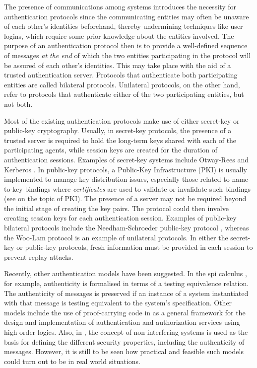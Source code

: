 \documentclass[10pt,a4paper,final,oneside,fleqn]{book}
\begin{document}
The presence of communications among systems introduces the necessity for authentication protocols since the communicating entities may often be unaware of each other's identities beforehand, thereby undermining techniques like user logins, which require some prior knowledge about the entities involved.  The purpose of an authentication protocol then is to provide a well-defined sequence of messages {\itshape at the end\/} of which the two entities participating in the protocol will be assured of each other's identities.  This may take place with the aid of a trusted authentication server.  Protocols that authenticate both participating entities are called bilateral protocols.  Unilateral protocols, on the other hand, refer to protocols that authenticate either of the two participating entities, but not both.

Most of the existing authentication protocols make use of either secret-key or public-key cryptography.  Usually, in secret-key protocols, the presence of a trusted server is required to hold the long-term keys shared with each of the participating agents, while session keys are created for the duration of authentication sessions.  Examples of secret-key systems include Otway-Rees \cite{otway1} and Kerberos \cite{miller1}.  In public-key protocols, a Public-Key Infrastructure (PKI) is usually implemented to manage key distribution issues, especially those related to name-to-key bindings where {\itshape certificates\/} are used to validate or invalidate such bindings (see \cite{ford1} on the topic of PKI).  The presence of a server may not be required beyond the initial stage of creating the key pairs.  The protocol could then involve creating session keys for each authentication session.  Examples of public-key bilateral protocols include the Needham-Schroeder public-key protocol \cite{needham1}, whereas the Woo-Lam protocol \cite{woo1} is an example of unilateral protocols.  In either the secret-key or public-key protocols, fresh information must be provided in each session to prevent replay attacks.

Recently, other authentication models have been suggested.  In the spi calculus \cite{abadi1}, for example, authenticity is formalised in terms of a testing equivalence relation.  The authenticity of messages is preserved if an instance of a system instantiated with that message is testing equivalent to the system's specification.  Other models include the use of proof-carrying code in \cite{appel1,bauer1} as a general framework for the design and implementation of authentication and authorization services using high-order logics.  Also, in \cite{focardi5}, the concept of non-interfering systems is used as the basis for defining the different security properties, including the authenticity of messages. However, it is still to be seen how practical and feasible such models could turn out to be in real world situations.
\end{document}
